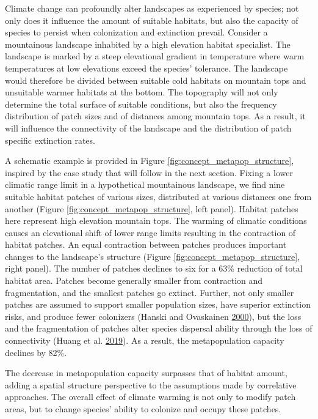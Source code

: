 \documentclass[12pt]{article}
\begin{document}
Climate change can profoundly alter landscapes as experienced by
species; not only does it influence the amount of suitable habitats, but
also the capacity of species to persist when colonization and extinction
prevail. Consider a mountainous landscape inhabited by a high elevation
habitat specialist. The landscape is marked by a steep elevational
gradient in temperature where warm temperatures at low elevations exceed
the species' tolerance. The landscape would therefore be divided between
suitable cold habitats on mountain tops and unsuitable warmer habitats
at the bottom. The topography will not only determine the total surface
of suitable conditions, but also the frequency distribution of patch
sizes and of distances among mountain tops. As a result, it will
influence the connectivity of the landscape and the distribution of
patch specific extinction rates.

A schematic example is provided in Figure
\ref{fig:concept_metapop_structure}, inspired by the case study that
will follow in the next section. Fixing a lower climatic range limit in
a hypothetical mountainous landscape, we find nine suitable habitat
patches of various sizes, distributed at various distances one from
another (Figure \ref{fig:concept_metapop_structure}, left panel).
Habitat patches here represent high elevation mountain tops. The warming
of climatic conditions causes an elevational shift of lower range limits
resulting in the contraction of habitat patches. An equal contraction
between patches produces important changes to the landscape's structure
(Figure \ref{fig:concept_metapop_structure}, right panel). The number of
patches declines to six for a 63\% reduction of total habitat area.
Patches become generally smaller from contraction and fragmentation, and
the smallest patches go extinct. Further, not only smaller patches are
assumed to support smaller population sizes, have superior extinction
risks, and produce fewer colonizers (Hanski and Ovaskainen
\protect\hyperlink{ref-hanski_metapopulation_2000}{2000}), but the loss
and the fragmentation of patches alter species dispersal ability through
the loss of connectivity (Huang et al.
\protect\hyperlink{ref-huang_using_2019}{2019}). As a result, the
metapopulation capacity declines by 82\%.

The decrease in metapopulation capacity surpasses that of habitat
amount, adding a spatial structure perspective to the assumptions made
by correlative approaches. The overall effect of climate warming is not
only to modify patch areas, but to change species' ability to colonize
and occupy these patches.
\end{document}

